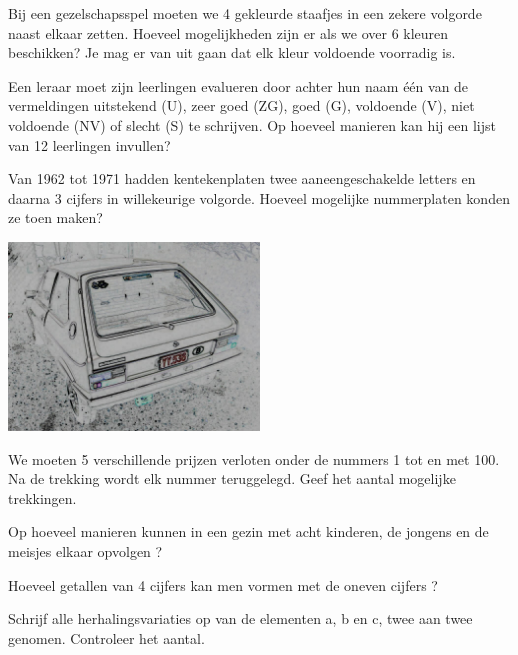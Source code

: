 \documentclass[12pt,a4paper,twoside]{article}
\begin{document}
\begin{oefening}
Bij een gezelschapsspel moeten we 4 gekleurde staafjes in een zekere volgorde naast elkaar zetten. Hoeveel mogelijkheden zijn er als we over 6 kleuren beschikken? Je mag er van uit gaan dat elk kleur voldoende voorradig is.
\end{oefening}

\begin{oefening}
Een leraar moet zijn leerlingen evalueren door achter hun naam één van de vermeldingen uitstekend (U), zeer goed (ZG), goed (G), voldoende (V), niet voldoende (NV) of slecht (S) te schrijven. Op hoeveel manieren kan hij een lijst van 12 leerlingen invullen?
\end{oefening}

\begin{oefening}
Van 1962 tot 1971 hadden kentekenplaten twee aaneengeschakelde letters en daarna 3 cijfers in willekeurige volgorde. Hoeveel mogelijke nummerplaten konden ze toen maken?
\begin{center}
\includegraphics[width=0.5\textwidth]{YY536}
\end{center}
\end{oefening}

\begin{oefening}
We moeten 5 verschillende prijzen verloten onder de nummers 1 tot en met 100.
Na de trekking wordt elk nummer teruggelegd. Geef het aantal mogelijke
trekkingen.
\end{oefening}

\begin{oefening}
Op hoeveel manieren kunnen in een gezin met acht kinderen, de jongens en de
meisjes elkaar opvolgen ?
\end{oefening}

\begin{oefening}
Hoeveel getallen van 4 cijfers kan men vormen met de oneven cijfers ?
\end{oefening}

\begin{oefening}
Schrijf alle herhalingsvariaties op van de elementen a, b en c, twee aan twee
genomen.
Controleer het aantal.
\end{oefening}
\end{document}
